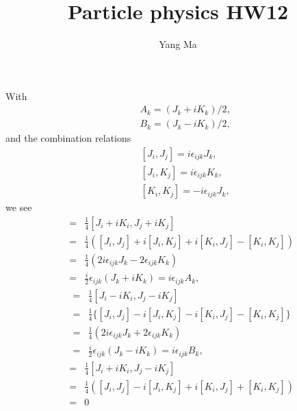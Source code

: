 \documentclass[11pt]{article}
\begin{document}
\title{Particle physics HW12}
\author{Yang Ma}

\maketitle

\section{ }
With
\begin{eqnarray}
    &&A_k = (J_k + i K_k)/2, \\
    &&B_k = (J_k - i K_k)/2, 
\end{eqnarray}
and the combination relations
\begin{eqnarray}
    &&[ J_i, J_j ] =  i \epsilon_{ijk} J_k, \\
    &&[ J_i, K_j ] =  i \epsilon_{ijk} K_k, \\
    && [ K_i, K_j ] = -i \epsilon_{ijk} J_k, 
\end{eqnarray}
we see
\begin{eqnarray}
    [ A_i, A_j ] &=& \frac{1}{4} [J_i + i K_i,J_j + i K_j] \\
    &=&\frac{1}{4}([J_i,J_j]+i[J_i,K_j]+i[K_i,J_j]-[K_i,K_j])\\
    &=&\frac{1}{4}(2i \epsilon_{ijk} J_k-2\epsilon_{ijk} K_k) \\
    &=&\frac{i}{2} \epsilon_{ijk} (J_k + i K_k) = i \epsilon_{ijk} A_k,
\end{eqnarray}
\begin{eqnarray}
    [ B_i, B_j ] &=& \frac{1}{4} [J_i - i K_i,J_j - i K_j] \\
    &=&\frac{1}{4}\{[J_i,J_j]-i[J_i,K_j]-i[K_i,J_j]-[K_i,K_j]\} \\
    &=&\frac{1}{4}(2i \epsilon_{ijk} J_k+2\epsilon_{ijk} K_k) \\
    &=&\frac{i}{2} \epsilon_{ijk} (J_k - i K_k) = i \epsilon_{ijk} B_k,
\end{eqnarray}
\begin{eqnarray}
    [ A_i, B_j ] &=& \frac{1}{4} [J_i + i K_i,J_j - i K_j] \\
    &=&\frac{1}{4}([J_i,J_j]-i[J_i,K_j]+i[K_i,J_j]+[K_i,K_j]) \\
    &=&0
\end{eqnarray}
\end{document}
